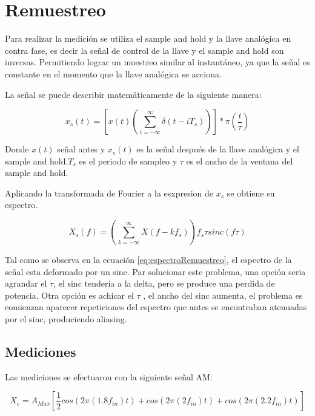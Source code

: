 \documentclass[../../ASSD_TP1_G7.tex]{subfiles}
\begin{document}
\chapter*{Remuestreo}
Para realizar la medición se utiliza el sample and hold y la llave analógica en contra fase, es decir la se\~nal de control de la llave y el sample and hold son inversas. Permitiendo lograr un muestreo similar al instantáneo, ya que la se\~nal es constante en el momento que la llave analógica se acciona.

La se\~nal se puede describir matemáticamente de la siguiente manera:

\begin{equation}
x_{s}(t)=\left[ x(t)\left( \sum_{i=-\infty}^{\infty} \delta(t - i T_s) \right) \right]* \pi(\frac{t}{\tau})
\end{equation}

\par Donde $x(t)$ se\~nal antes y $x_{s}(t)$ es la se\~nal después de la llave analógica y el sample and hold.$T_s$ es el periodo de sampleo y $\tau$ es el ancho de la ventana del sample and hold.
\par Aplicando la transformada de Fourier a la esxpresion de $x_{s}$ se obtiene su espectro.

\begin{equation}
X_{s}(f)=\left( \sum_{k=-\infty}^{\infty} X(f - k f _s) \right) f _s \tau sinc(f \tau) \label{eq:espectroRemuestreo}
\end{equation}

Tal como se observa en la ecuación \ref{eq:espectroRemuestreo}, el espectro de la se\~nal esta deformado por un sinc. Par solucionar este problema, una opción seria agrandar el $\tau$, el sinc tendería a la delta, pero se produce una perdida de potencia. Otra opción es achicar el $\tau$ , el ancho del sinc aumenta, el problema es comienzan aparecer repeticiones del espectro que antes se encontraban atenuadas por el sinc, produciendo aliasing.



\section*{Mediciones}

Las mediciones se efectuaron con la siguiente se\~nal AM:

\begin{equation}
X_c=A_{Max}[\frac{1}{2}cos(2\pi (1.8 f_{in})t)+cos(2\pi (2 f_{in})t)+cos(2\pi (2.2 f_{in})t)]
\end{equation}\label{eq:inputSignlanAM}
\end{document}
